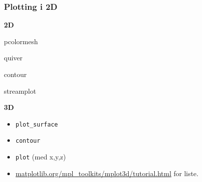 \documentclass{beamer}
\begin{document}
\begin{frame}[fragile]
  \frametitle{Plotting i 2D}
  \begin{minipage}[t]{.45\linewidth}
    \centering
    \textbf{2D}
  \begin{itemize}
  \item pcolormesh
  \item quiver
    {\color{gray}
    \item contour
    \item streamplot
      }
  \end{itemize}
  \end{minipage}
  \begin{minipage}[t]{.45\linewidth}
    \centering
    \textbf{3D}
    \begin{itemize}
      \color{gray}
    \item \lstinline{plot_surface}
    \item \lstinline{contour}
    \item \lstinline{plot} (med x,y,z)
    \item \url{matplotlib.org/mpl_toolkits/mplot3d/tutorial.html} for liste.
    \end{itemize}
  \end{minipage}
\end{frame}
\end{document}

